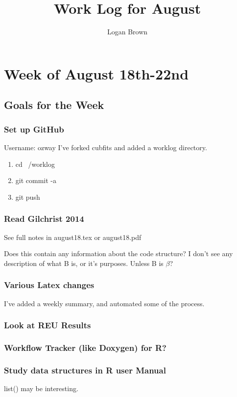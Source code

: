 \documentclass[11pt]{article} %
\title{Work Log for August}
\author{Logan Brown}
\begin{document}
\maketitle


\setcounter{section}{02} %
\setcounter{subsection}{-1}
\setcounter{subsubsection}{0}

\section{Week of August 18th-22nd}
\subsection{Goals for the Week}
\subsubsection{Set up GitHub}
Username: ozway
I've forked cubfits and added a worklog directory.
\begin{enumerate}
\item cd ~/worklog
\item git commit -a
\item git push
\end{enumerate}

\subsubsection{Read Gilchrist 2014}
See full notes in august18.tex or august18.pdf

Does this contain any information about the code structure? I don't see any description of what B is, or it's purposes. Unless B is $\beta$?

\subsubsection{Various Latex changes}
I've added a weekly summary, and automated some of the process.

\subsubsection{Look at REU Results}


\subsubsection{Workflow Tracker (like Doxygen) for R?}
\subsubsection{Study data structures in R user Manual}
list() may be interesting.
\end{document}
